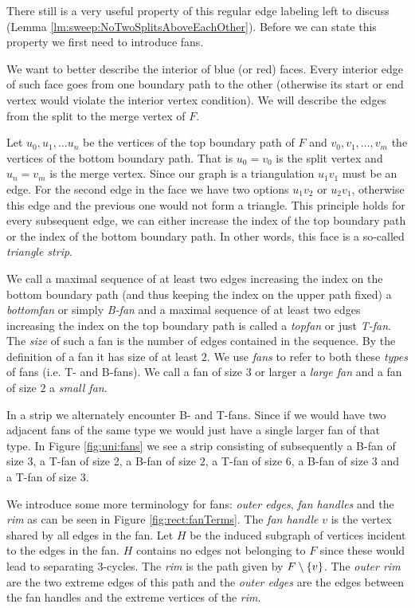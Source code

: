       There still is a very useful property of this regular edge labeling left to discuss (Lemma \ref{lm:sweep:NoTwoSplitsAboveEachOther}). Before we can state this property we first need to introduce fans.


      We want to better describe the interior of blue (or red) faces. Every interior edge of such face goes from one boundary path to the other (otherwise its start or end vertex would violate the interior vertex condition). We will describe the edges from the split to the merge vertex of $F$.

      Let $u_0 , u_1, \ldots u_n$ be the vertices of the top boundary path of $F$ and $v_0, v_1, \ldots, v_m$ the vertices of the bottom boundary path. That is $u_0=v_0$ is the split vertex and $u_n = v_m$ is the merge vertex. Since our graph is a triangulation $u_1v_1$ must be an edge. For the second edge in the face we have two options $u_1v_2$ or $u_2v_1$, otherwise this edge and the previous one would not form a triangle. This principle holds for every subsequent edge, we can either increase the index of the top boundary path or the index of the bottom boundary path. In other words, this face is a so-called \emph{triangle strip}.

      We call a maximal sequence of at least two edges increasing the index on the bottom boundary path (and thus keeping the index on the upper path fixed) a \emph{bottomfan} or simply \emph{B-fan} and a maximal sequence of at least two edges increasing the index on the top boundary path is called a \emph{topfan} or just \emph{T-fan}.
      The \emph{size} of such a fan is the number of edges contained in the sequence. By the definition of a fan it has size of at least $2$.
      We use \emph{fans} to refer to both these \emph{types} of fans (i.e. T- and B-fans).
      We call a fan of size $3$ or larger a \emph{large fan} and a fan of size $2$ a \emph{small fan}.

      In a strip we alternately encounter B- and T-fans. Since if we would have two adjacent fans of the same type we would just have a single larger fan of that type.
      In Figure \ref{fig:uni:fans} we see a strip consisting of subsequently a B-fan of size $3$, a T-fan of size 2, a B-fan of size $2$, a T-fan of size $6$, a B-fan of size $3$ and a T-fan of size $3$.



       We introduce some more terminology for fans: \emph{outer edges}, \emph{fan handles} and the \emph{rim} as can be seen in Figure \ref{fig:rect:fanTerms}. The \emph{fan handle} $v$ is the vertex shared by all edges in the fan. Let $H$ be the induced subgraph of vertices incident to the edges in the fan. $H$ contains no edges not belonging to $F$ since these would lead to separating 3-cycles. The \emph{rim} is the path given by $F\setminus \left\lbrace {v} \right\rbrace$.
       The \emph{outer rim} are the two extreme edges of this path and the \emph{outer edges} are the edges between the fan handles and the extreme vertices of the \emph{rim}.

